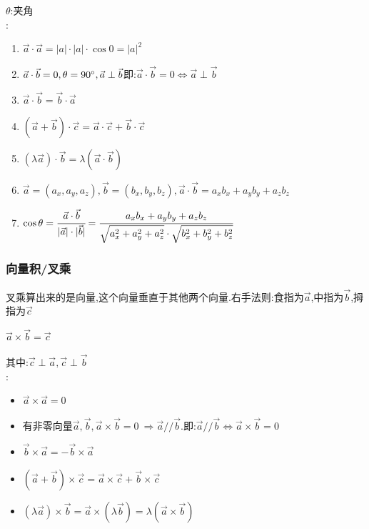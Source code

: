 {{{      $\theta$:夹角\\

      :
      \begin{enumerate}
        \item $\vec{a}\cdot\vec{a} = |a|\cdot|a|\cdot\cos0 = |a|^2$
        \item $\vec{a}\cdot\vec{b} = 0,\theta = 90^\circ,\vec{a} \perp \vec{b}$\qquad 即:$\vec{a}\cdot\vec{b} = 0 \Leftrightarrow \vec{a} \perp \vec{b}$
        \item $\vec{a}\cdot\vec{b} = \vec{b}\cdot\vec{a}$
        \item $(\vec{a}+\vec{b})\cdot\vec{c} = \vec{a}\cdot\vec{c} + \vec{b}\cdot\vec{c}$
        \item $(\lambda\vec{a})\cdot\vec{b} = \lambda(\vec{a}\cdot\vec{b})$
        \item $\vec{a} = (a_x,a_y,a_z),\vec{b} = (b_x,b_y,b_z),\vec{a}\cdot\vec{b} = a_xb_x + a_yb_y + a_zb_z$
        \item $\cos\theta = \cfrac{\vec{a}\cdot\vec{b}}{|\vec{a}|\cdot|\vec{b}|} = \cfrac{a_xb_x + a_yb_y + a_zb_z}{\sqrt{a_x^2 + a_y^2 + a_z^2}\cdot\sqrt{b_x^2 + b_y^2 + b_z^2}}$
      \end{enumerate}

    }%

    \subsubsection{向量积/叉乘}{
      叉乘算出来的是向量,这个向量垂直于其他两个向量.右手法则:食指为$\vec{a}$,中指为$\vec{b}$,拇指为$\vec{c}$

      $\vec{a}\times\vec{b} = \vec{c}$

      其中:$\vec{c}\perp\vec{a},\vec{c}\perp\vec{b}$\\

      :
      \begin{itemize}
        \item $\vec{a}\times\vec{a} = 0$
        \item 有非零向量$\vec{a},\vec{b},\vec{a}\times\vec{b} = 0\ \Rightarrow \vec{a} // \vec{b}$.即:$\vec{a} // \vec{b} \Leftrightarrow \vec{a} \times \vec{b} = 0$
        \item $\vec{b}\times\vec{a} = -\vec{b}\times\vec{a}$
        \item $(\vec{a} + \vec{b})\times\vec{c} = \vec{a} \times \vec{c} + \vec{b} \times \vec{c}$
        \item $(\lambda\vec{a})\times\vec{b} = \vec{a} \times (\lambda\vec{b}) = \lambda(\vec{a}\times\vec{b})$
      \end{itemize}

}}}
